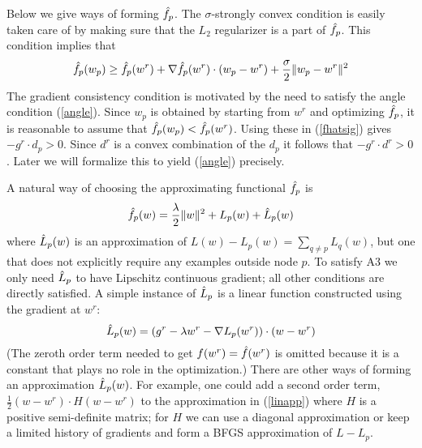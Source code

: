 Below we give ways of forming $\hat{f}_p$. The $\sigma$-strongly convex condition is easily taken care of by making sure that the $L_2$ regularizer is a part of $\hat{f}_p$. This condition implies that
\begin{equation}
\hat{f}_p(w_p) \ge \hat{f}_p(w^r) + \nabla\hat{f}_p(w^r)\cdot (w_p-w^r) + \frac{\sigma}{2} \|w_p-w^r\|^2
\label{fhatsig}
\end{equation}
The gradient consistency condition is motivated by the need to satisfy the angle condition (\ref{angle}). Since $w_p$ is obtained by starting from $w^r$ and optimizing $\hat{f}_p$, it is reasonable to assume that $\hat{f}_p(w_p)<\hat{f}_p(w^r)$. Using these in (\ref{fhatsig}) gives $-g^r\cdot d_p > 0$. Since $d^r$ is a convex combination of the $d_p$ it follows that $-g^r\cdot d^r > 0$. Later we will formalize this to yield (\ref{angle}) precisely.

A natural way of choosing the approximating functional $\hat{f}_p$ is
\begin{equation}
\hat{f}_p(w) = \frac{\lambda}{2} \|w\|^2 + L_p(w) +\hat{L}_p(w)
\label{riskapp}
\end{equation}
where $\hat{L}_p(w)$ is an approximation of $L(w)-L_p(w)=\sum_{q\not= p} L_q(w)$, but one that does not explicitly require any examples outside node $p$. To satisfy A3 we only need $\hat{L}_p$ to have Lipschitz continuous gradient; all other conditions are directly satisfied. A simple instance of $\hat{L}_p$ is a linear function constructed using the gradient at $w^r$:
\begin{equation}
\hat{L}_p(w) = (g^r - \lambda w^r-\nabla L_p(w^r))\cdot(w-w^r)
\label{linapp}
\end{equation}
(The zeroth order term needed to get $f(w^r)=\hat{f}(w^r)$ is omitted because it is a constant that plays no role in the optimization.) There are other ways of forming an approximation $\hat{L}_p(w)$. For example, one could add a second order term, $\frac{1}{2}(w-w^r)\cdot H(w-w^r)$ to the approximation in (\ref{linapp}) where $H$ is a positive semi-definite matrix; for $H$ we can use a diagonal approximation or keep a limited history of gradients and form a BFGS approximation of $L-L_p$.


